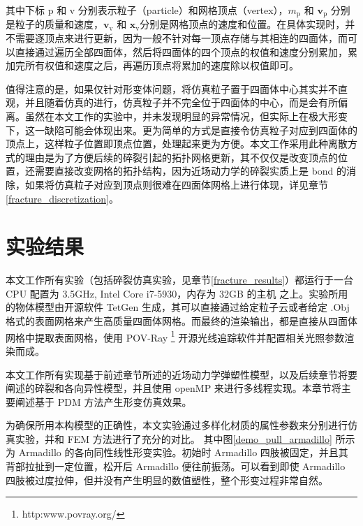 其中下标 $\mathrm{p}$ 和 $\mathrm{v}$ 分别表示粒子（particle）和网格顶点（vertex），$m_{\mathrm{p}}$ 和 $\textbf{v}_{\mathrm{p}}$ 分别是粒子的质量和速度，$\textbf{v}_{\mathrm{v}}$ 和 $\textbf{x}_{\mathrm{v}}$分别是网格顶点的速度和位置。在具体实现时，并不需要逐顶点来进行更新，因为一般不针对每一顶点存储与其相连的四面体，而可以直接通过遍历全部四面体，然后将四面体的四个顶点的权值和速度分别累加，累加完所有权值和速度之后，再遍历顶点将累加的速度除以权值即可。

值得注意的是，如果仅针对形变体问题，将仿真粒子置于四面体中心其实并不直观，并且随着仿真的进行，仿真粒子并不完全位于四面体的中心，而是会有所偏离。虽然在本文工作的实验中，并未发现明显的异常情况，但实际上在极大形变下，这一缺陷可能会体现出来。更为简单的方式是直接令仿真粒子对应到四面体的顶点上，这样粒子位置即顶点位置，处理起来更为方便。本文工作采用此种离散方式的理由是为了方便后续的碎裂引起的拓扑网格更新，其不仅仅是改变顶点的位置，还需要直接改变网格的拓扑结构，因为近场动力学的碎裂实质上是 bond 的消除，如果将仿真粒子对应到顶点则很难在四面体网格上进行体现，详见章节 \ref{fracture_discretization}。



\section{实验结果}
\label{deformation_results}

本文工作所有实验（包括碎裂仿真实验，见章节\ref{fracture_results}）都运行于一台 CPU 配置为 3.5GHz, Intel Core i7-5930，内存为 32GB 的主机 之上。实验所用的物体模型由开源软件 TetGen 生成，其可以直接通过给定粒子云或者给定 .Obj 格式的表面网格来产生高质量四面体网格。而最终的渲染输出，都是直接从四面体网格中提取表面网格，使用 POV-Ray \footnote{http:www.povray.org/} 开源光线追踪软件并配置相关光照参数渲染而成。

本文工作所有实现基于前述章节所述的近场动力学弹塑性模型，以及后续章节将要阐述的碎裂和各向异性模型，并且使用 openMP 来进行多线程实现。本章节将主要阐述基于 PDM 方法产生形变仿真效果。

为确保所用本构模型的正确性，本文实验通过多样化材质的属性参数来分别进行仿真实验，并和 FEM 方法进行了充分的对比。
其中图\ref{demo_pull_armadillo} 所示为 Armadillo 的各向同性线性形变实验。初始时 Armadillo 四肢被固定，并且其背部拉扯到一定位置，松开后 Armadillo 便往前振荡。可以看到即使 Armadillo 四肢被过度拉伸，但并没有产生明显的数值塑性，整个形变过程非常自然。


